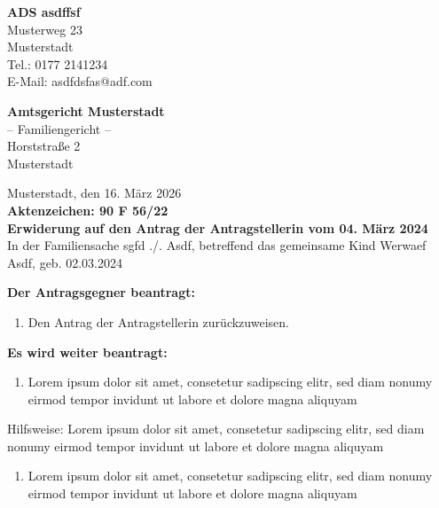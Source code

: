 \documentclass[
  12pt,
  a4paper,
]{article}
\providecommand{\tightlist}{%
  \setlength{\itemsep}{0pt}\setlength{\parskip}{0pt}}
\begin{document}
\noindent \textbf{ADS asdffsf}\\[0mm]
\noindent Musterweg 23\\[0mm]
 Musterstadt\\[0mm]
\noindent Tel.: 0177 2141234\\[0mm]
\noindent E-Mail: asdfdsfas@adf.com\par
\par\vspace{14pt}
\noindent \textbf{Amtsgericht Musterstadt}\\[0mm]
\noindent – Familiengericht –\\[0mm]
\noindent Horststraße 2\\[0mm]
 Musterstadt\par
\hfill Musterstadt, den 16. März 2026\\[1mm]
\noindent\textbf{Aktenzeichen: 90 F 56/22}\\[3mm]
\noindent\textbf{{Erwiderung auf den Antrag der Antragstellerin vom 04. März 2024}}\\[4mm]
\noindent In der Familiensache sgfd ./. Asdf, betreffend das gemeinsame Kind Werwaef Asdf, geb. 02.03.2024\\[0mm]
\medskip

\textbf{Der Antragsgegner beantragt:}

\begin{enumerate}
\def\labelenumi{\arabic{enumi}.}
\tightlist
\item
  Den Antrag der Antragstellerin zurückzuweisen.
\end{enumerate}

\textbf{Es wird weiter beantragt:}

\begin{enumerate}
\def\labelenumi{\arabic{enumi}.}
\setcounter{enumi}{1}
\tightlist
\item
  Lorem ipsum dolor sit amet, consetetur sadipscing elitr, sed diam
  nonumy eirmod tempor invidunt ut labore et dolore magna aliquyam
\end{enumerate}

Hilfsweise: Lorem ipsum dolor sit amet, consetetur sadipscing elitr, sed
diam nonumy eirmod tempor invidunt ut labore et dolore magna aliquyam

\begin{enumerate}
\def\labelenumi{\arabic{enumi}.}
\setcounter{enumi}{2}
\tightlist
\item
  Lorem ipsum dolor sit amet, consetetur sadipscing elitr, sed diam
  nonumy eirmod tempor invidunt ut labore et dolore magna aliquyam
\end{enumerate}
\end{document}
